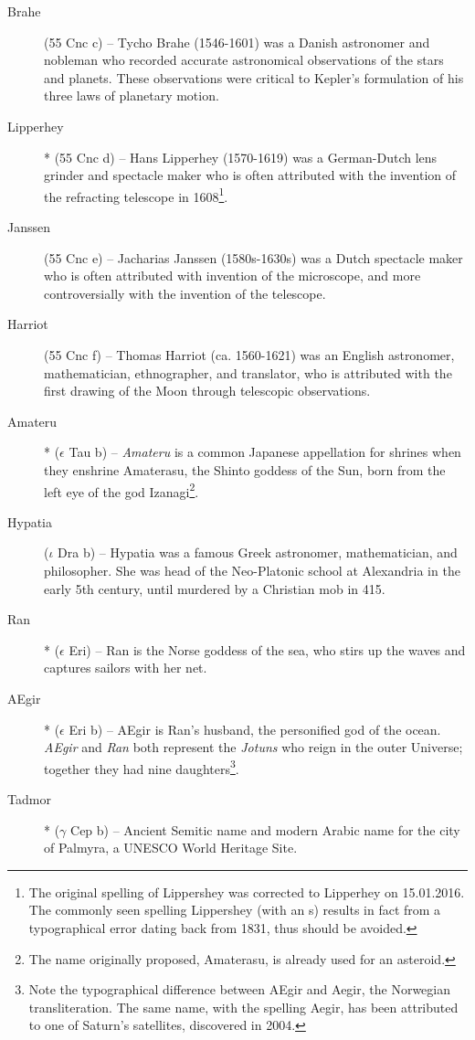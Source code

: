 \begin{description}
\item[Brahe] (55 Cnc c) -- Tycho Brahe (1546-1601) was a Danish astronomer and nobleman who recorded accurate astronomical observations of the stars and planets. These observations were critical to Kepler's formulation of his three laws of planetary motion.
\item[Lipperhey]* (55 Cnc d) -- Hans Lipperhey (1570-1619) was a German-Dutch lens grinder and spectacle maker who is often attributed with the invention of the refracting telescope in 1608\footnote{The original spelling of Lippershey was corrected to Lipperhey on 15.01.2016. The commonly seen spelling Lippershey (with an s) results in fact from a typographical error dating back from 1831, thus should be avoided.}.
\item[Janssen] (55 Cnc e) -- Jacharias Janssen (1580s-1630s) was a Dutch spectacle maker who is often attributed with invention of the microscope, and more controversially with the invention of the telescope.
\item[Harriot] (55 Cnc f) -- Thomas Harriot (ca. 1560-1621) was an English astronomer, mathematician, ethnographer, and translator, who is attributed with the first drawing of the Moon through telescopic observations.
\item[Amateru]* ($\epsilon$ Tau b) -- \textit{Amateru} is a common Japanese appellation for shrines when they enshrine Amaterasu, the Shinto goddess of the Sun, born from the left eye of the god Izanagi\footnote{The name originally proposed, Amaterasu, is already used for an asteroid.}.
\item[Hypatia] ($\iota$ Dra b) -- Hypatia was a famous Greek astronomer, mathematician, and philosopher. She was head of the Neo-Platonic school at Alexandria in the early 5th century, until murdered by a Christian mob in 415.
\item[Ran]* ($\epsilon$ Eri) -- Ran is the Norse goddess of the sea, who stirs up the waves and captures sailors with her net.
\item[AEgir]* ($\epsilon$ Eri b) -- AEgir is Ran's husband, the personified god of the ocean. \textit{AEgir} and \textit{Ran} both represent the \textit{Jotuns} who reign in the outer Universe; together they had nine daughters\footnote{Note the typographical difference between AEgir and Aegir, the Norwegian transliteration. The same name, with the spelling Aegir, has been attributed to one of Saturn's satellites, discovered in 2004.}.
\item[Tadmor]* ($\gamma$ Cep b) -- Ancient Semitic name and modern Arabic name for the city of Palmyra, a UNESCO World Heritage Site.

\end{description}
